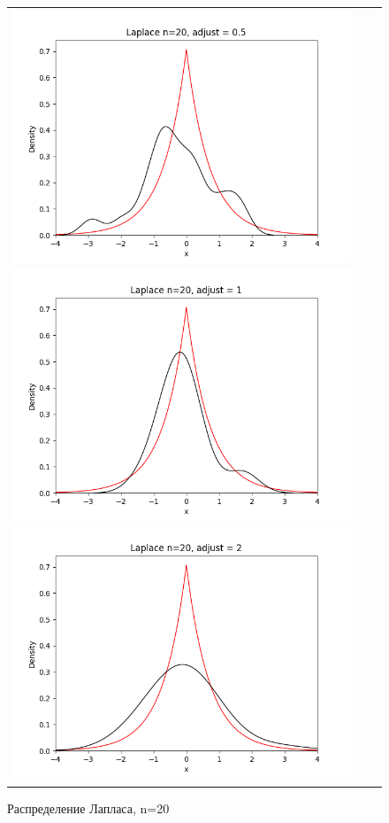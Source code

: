 \begin{figure}[H]
	\begin{tabular}{ccc}
		\includegraphics[scale=0.33]{laplace_n20_adjust0.5.png}
		\includegraphics[scale=0.33]{laplace_n20_adjust1.png}
		\includegraphics[scale=0.33]{laplace_n20_adjust2.png}
	\end{tabular}
	\caption{Распределение Лапласа, n=20}
\end{figure}

